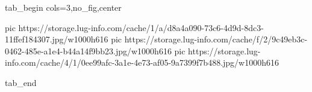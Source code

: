  
 
 
 
 


\ifcmt
  tab_begin cols=3,no_fig,center

     pic https://storage.lug-info.com/cache/1/a/d8a4a090-73c6-4d9d-8dc3-11ffef184307.jpg/w1000h616%
		 pic https://storage.lug-info.com/cache/f/2/9c49eb3c-0462-485e-a1e4-b44a14f9bb23.jpg/w1000h616%
		 pic https://storage.lug-info.com/cache/4/1/0ee99afc-3a1e-4e73-af05-9a7399f7b488.jpg/w1000h616%

  tab_end
\fi
